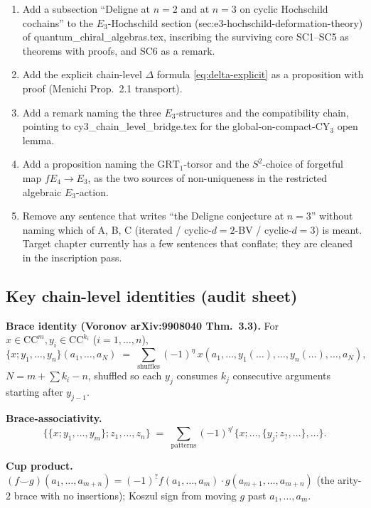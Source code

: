 \documentclass[11pt]{article}
\theoremstyle{definition}
\theoremstyle{remark}
\newcommand{\CC}{\mathrm{CC}}
\begin{document}
\begin{enumerate}
\item Add a subsection ``Deligne at $n=2$ and at $n=3$ on cyclic
Hochschild cochains'' to the $E_3$-Hochschild section
(sec:e3-hochschild-deformation-theory) of
quantum\_chiral\_algebras.tex, inscribing the surviving core
SC1--SC5 as theorems with proofs, and SC6 as a remark.

\item Add the explicit chain-level $\Delta$ formula
\eqref{eq:delta-explicit} as a proposition with proof (Menichi
Prop.~2.1 transport).

\item Add a remark naming the three $E_3$-structures and the
compatibility chain, pointing to cy3\_chain\_level\_bridge.tex for
the global-on-compact-CY$_3$ open lemma.

\item Add a proposition naming the $\mathrm{GRT}_1$-torsor and the
$S^2$-choice of forgetful map $fE_4 \to E_3$, as the two sources of
non-uniqueness in the restricted algebraic $E_3$-action.

\item Remove any sentence that writes ``the Deligne conjecture at
$n=3$'' without naming which of A, B, C (iterated /
cyclic-$d=2$-BV / cyclic-$d=3$) is meant. Target chapter currently
has a few sentences that conflate; they are cleaned in the
inscription pass.
\end{enumerate}

\subsection*{Key chain-level identities (audit sheet)}

\textbf{Brace identity (Voronov arXiv:9908040 Thm.~3.3).}
For $x \in \CC^m, y_i \in \CC^{k_i}$ ($i = 1, \ldots, n$),
\[
 \{x; y_1, \ldots, y_n\}(a_1, \ldots, a_N)
 \;=\;
 \sum_{\mathrm{shuffles}} (-1)^\eta\,
 x(a_1, \ldots, y_1(\ldots), \ldots, y_n(\ldots), \ldots, a_N),
\]
$N = m + \sum k_i - n$, shuffled so each $y_j$ consumes $k_j$ consecutive arguments starting after $y_{j-1}$.

\textbf{Brace-associativity.}
\[
 \{\{x; y_1, \ldots, y_m\}; z_1, \ldots, z_n\}
 \;=\;
 \sum_{\mathrm{patterns}} (-1)^{\eta'}
 \{x; \ldots, \{y_j; z_?, \ldots\}, \ldots\}.
\]

\textbf{Cup product.} $(f \smile g)(a_1, \ldots, a_{m+n}) =
(-1)^{?} f(a_1, \ldots, a_m) \cdot g(a_{m+1}, \ldots, a_{m+n})$
(the arity-$2$ brace with no insertions); Koszul sign from moving
$g$ past $a_1, \ldots, a_m$.
\end{document}
